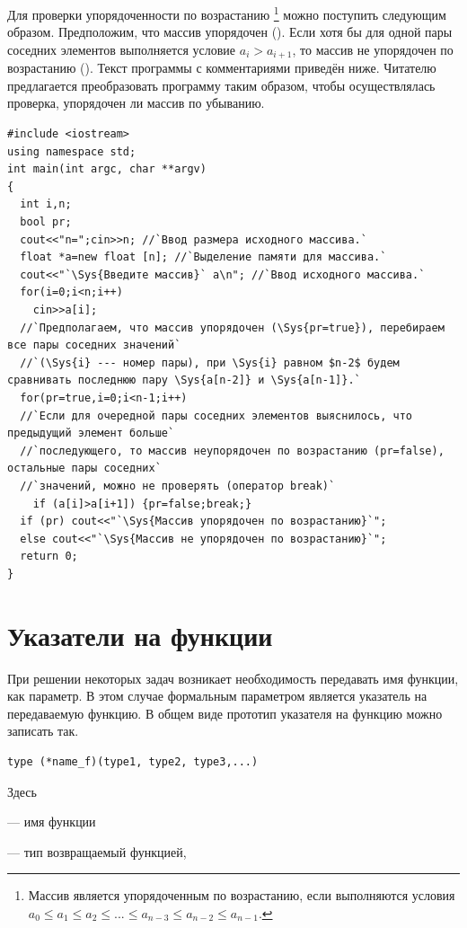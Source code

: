 
Для проверки упорядоченности по возрастанию \footnote{Массив является упорядоченным по
возрастанию, если выполняются условия  $a_0\leqslant a_1\leqslant a_2\leqslant ...\leqslant a_{n-3}\leqslant a_{n-2}\leqslant a_{n-1}$.} можно
поступить следующим образом. Предположим, что массив упорядочен (). Если хотя бы для одной
пары соседних элементов выполняется условие $a_i>a_{i+1}$, то массив не упорядочен по возрастанию
(). Текст программы с комментариями приведён ниже. Читателю предлагается преобразовать
программу таким образом, чтобы осуществлялась проверка, упорядочен ли массив по убыванию.
\begin{lstlisting}
#include <iostream>
using namespace std;
int main(int argc, char **argv)
{
  int i,n;
  bool pr;
  cout<<"n=";cin>>n; //`Ввод размера исходного массива.`
  float *a=new float [n]; //`Выделение памяти для массива.`
  cout<<"`\Sys{Введите массив}` a\n"; //`Ввод исходного массива.`
  for(i=0;i<n;i++)
    cin>>a[i];
  //`Предполагаем, что массив упорядочен (\Sys{pr=true}), перебираем все пары соседних значений`
  //`(\Sys{i} --- номер пары), при \Sys{i} равном $n-2$ будем сравнивать последнюю пару \Sys{a[n-2]} и \Sys{a[n-1]}.`
  for(pr=true,i=0;i<n-1;i++)
  //`Если для очередной пары соседних элементов выяснилось, что предыдущий элемент больше` 
  //`последующего, то массив неупорядочен по возрастанию (pr=false), остальные пары соседних` 
  //`значений, можно не проверять (оператор break)` 
    if (a[i]>a[i+1]) {pr=false;break;}
  if (pr) cout<<"`\Sys{Массив упорядочен по возрастанию}`";
  else cout<<"`\Sys{Массив не упорядочен по возрастанию}`";
  return 0;
}
\end{lstlisting}

\section[Указатели на функции]{Указатели на функции}
При решении некоторых задач возникает необходимость передавать имя функции, как параметр. В этом случае формальным
параметром является указатель на передаваемую функцию. В общем виде прототип указателя на функцию можно записать так.
\begin{lstlisting}
type (*name_f)(type1, type2, type3,...)
\end{lstlisting}
Здесь

 --- имя функции

 --- тип возвращаемый функцией, 

